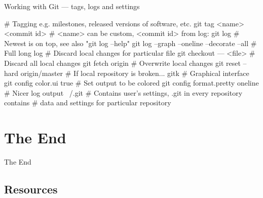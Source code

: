 \documentclass[compress, ucs, xelatex, 11pt, xcolor=svgnames,
  hyperref={
    bookmarks=true,
    unicode=true,
    colorlinks=true,
    pdftitle={Linux, command line and MetaCentrum},
    plainpages=false,
    pdfauthor={Vojtech Zeisek},
    pdfsubject={Course about use of Linux command line, writing shell scripts and using MetaCentrum of CESNET},
    pdfcreator={XeLaTeX},
    pdfkeywords={Linux, GNU, BASH, shell, command line, MetaCentrum},
    linkcolor=DarkRed,
    anchorcolor=DarkBlue,
    citecolor=Indigo,
    filecolor=NavyBlue,
    menucolor=DarkMagenta,
    urlcolor=DarkBlue,
    pdftex},
  url={hyphens, lowtilde} %
  ]{beamer}
\begin{document}
\begin{frame}[fragile]{Working with Git --- tags, logs and settings}
  \begin{bashcode}
    # Tagging e.g. milestones, released versions of software, etc.
    git tag <name> <commit id> # <name> can be custom, <commit id> from log:
    git log # Newest is on top, see also "git log --help"
    git log --graph --oneline --decorate --all # Full long log
    # Discard local changes for particular file
    git checkout --- <file>
    # Discard all local changes
    git fetch origin # Overwrite local changes
    git reset --hard origin/master # If local repository is broken...
    gitk # Graphical interface
    git config color.ui true # Set output to be colored
    git config format.pretty oneline # Nicer log output
    ~/.git # Contains user's settings, .git in every repository contains
           # data and settings for particular repository
  \end{bashcode}
\end{frame}

\section{The End}

\begin{frame}{The End}
  \tableofcontents[currentsection, sectionstyle=show/hide, hideothersubsections]
\end{frame}



\subsection{Resources} %
\end{document}
